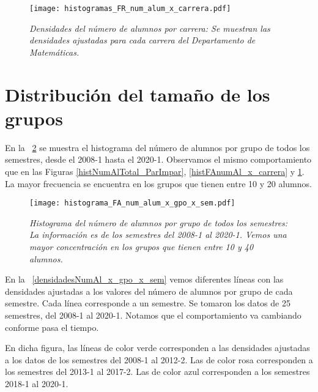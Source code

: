 \begin{figure}[H]
\centering
\texttt{[image: histogramas\_FR\_num\_alum\_x\_carrera.pdf]} %
\caption[\textit{Densidades del número de alumnos por carrera}]{\textit{Densidades del número de alumnos por carrera: Se muestran las densidades ajustadas para cada carrera del Departamento de Matemáticas.}}\label{histFRnumAl_x_carrera}
\end{figure}


\section{Distribución del tamaño de los grupos} \label{DitribTamGpos}

En la \figurename{~\ref{histNumAl_x_gpo_x_sem}} se muestra el histograma del número de alumnos por grupo de todos los semestres, desde el 2008-1 hasta el 2020-1. Observamos el mismo comportamiento que en las Figuras \ref{histNumAlTotal_ParImpar}, \ref{histFAnumAl_x_carrera} y \ref{histFRnumAl_x_carrera}. La mayor frecuencia se encuentra en los grupos que tienen entre 10 y 20 alumnos.

\begin{figure}[H]
\centering
\texttt{[image: histograma\_FA\_num\_alum\_x\_gpo\_x\_sem.pdf]} %
\caption[\textit{Histograma del número de alumnos por grupo de todos los semestres}]{\textit{Histograma del número de alumnos por grupo de todos los semestres: La información es de los semestres del 2008-1 al 2020-1. Vemos una mayor concentración en los grupos que tienen entre 10 y 40 alumnos.}}\label{histNumAl_x_gpo_x_sem}
\end{figure}


En la \figurename{~\ref{densidadesNumAl_x_gpo_x_sem}} vemos diferentes líneas con las densidades ajustadas a los valores del número de alumnos por grupo de cada semestre. Cada línea corresponde a un semestre. Se tomaron los datos de 25 semestres, del 2008-1 al 2020-1. Notamos que el comportamiento va cambiando conforme pasa el tiempo.

En dicha figura, las líneas de color verde corresponden a las densidades ajustadas a los datos de los semestres del 2008-1 al 2012-2. Las de color rosa corresponden a los semestres del 2013-1 al 2017-2. Las de color azul corresponden a los semestres 2018-1 al 2020-1.

